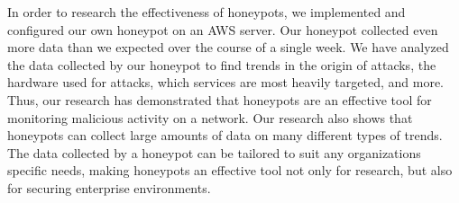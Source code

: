In order to research the effectiveness of honeypots, we implemented and configured our own honeypot on an AWS server. Our honeypot collected even more data than we expected over the course of a single week. We have analyzed the data collected by our honeypot to find trends in the origin of attacks, the hardware used for attacks, which services are most heavily targeted, and more. Thus, our research has demonstrated that honeypots are an effective tool for monitoring malicious activity on a network. Our research also shows that honeypots can collect large amounts of data on many different types of trends. The data collected by a honeypot can be tailored to suit any organizations specific needs, making honeypots an effective tool not only for research, but also for securing enterprise environments. 